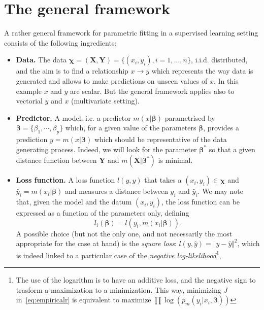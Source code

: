 \documentclass{article}
\begin{document}
\section{The general framework}
A rather general framework for parametric fitting in a supervised learning setting consists of the following ingredients:
\begin{itemize}
    \item \textbf{Data.} The data $\boldsymbol{\chi}=(\mathbf{X},\mathbf{Y})=\lbrace(x_i,y_i),i=1,\ldots,n\rbrace$, i.i.d. distributed, and the aim is to find a
        relationship $x \to y$ which represents the way data is generated and allows to make predictions on unseen values of $x$. 
        In this example $x$ and $y$ are scalar. But the general framework applies also to vectorial $y$ and $x$ (multivariate setting).
    \item \textbf{Predictor.} A model, i.e. a predictor $m(x|\boldsymbol{\beta})$ parametrised by $\boldsymbol{\beta}= \lbrace\beta_1,\cdots,\beta_p\rbrace$
    which, for a given value of the parameters $\boldsymbol{\beta}$, provides a prediction  $y=m(x|\boldsymbol{\beta})$
    which should be representative of the data generating process. Indeed, we will look for the parameter $\boldsymbol{\beta}^*$ so that a given distance function between $\boldsymbol{Y}$ and $m(\boldsymbol{X}|\boldsymbol{\beta}^*)$
    is minimal.
    \item \textbf{Loss function.} A loss function $l(y,\hat{y})$ that takes a $(x_i,y_i)\in\boldsymbol{\chi}$ and $\hat{y}_i=m(x_i|\boldsymbol{\beta})$
    and measures a distance between $y_i$ and $\hat{y}_i$. 
        We may note that, given the model and the datum $(x_i,y_i)$, the loss function can be expressed as a function of the parameters only, defining
    \begin{equation}\label{eq:lossfun}
    l_i(\boldsymbol{\beta})=l(y_i,m(x_i|\boldsymbol{\beta})).
    \end{equation}
    A possible choice (but not the only one, and not necessarily the most appropriate for the case at hand) is the \emph{square loss}: $l(y,\hat{y})=\Vert y-\hat{y}\Vert^2$, which is indeed linked to a particular case of the \emph{negative log-likelihood}\footnote{The use of the logarithm is to have an additive loss, and the negative sign to trasform a maximization to a minimization. This way, minimizing $J$ in~\eqref{eq:empiricalr} is equivalent to maximize $\prod \log(p_m(y_i|x_i,\boldsymbol{\beta}))$},
     \begin{equation}\label{eq:lossfunnl}

\end{equation}
\end{itemize}
\end{document}
